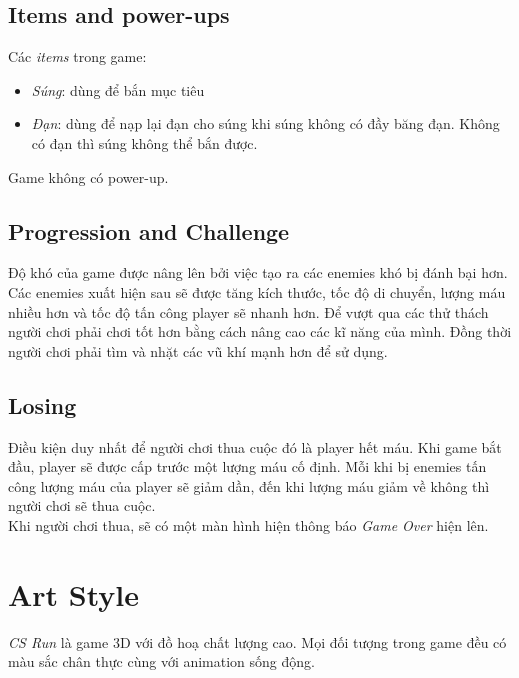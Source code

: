 \documentclass[14pt,a4paper]{extreport}
\begin{document}

\section{Items and power-ups}
Các \textit{items} trong game: 
\begin{itemize}
	\item \textit{Súng}: dùng để bắn mục tiêu
	\item \textit{Đạn}: dùng để nạp lại đạn cho súng khi súng không có đầy băng đạn. Không có đạn thì súng không thể bắn được.

\end{itemize}

Game không có power-up.

\section{Progression and Challenge}
Độ khó của game được nâng lên bởi việc tạo ra các enemies khó bị đánh bại hơn. Các enemies xuất hiện sau sẽ được tăng kích thước, tốc độ di chuyển, lượng máu nhiều hơn và tốc độ tấn công player sẽ nhanh hơn. Để vượt qua các thử thách người chơi phải chơi tốt hơn bằng cách nâng cao các kĩ năng của mình. Đồng thời người chơi phải tìm và nhặt các vũ khí mạnh hơn để sử dụng.


\section{Losing}
Điều kiện duy nhất để người chơi thua cuộc đó là player hết máu. Khi game bắt đầu, player sẽ được cấp trước một lượng máu cố định. Mỗi khi bị enemies tấn công lượng máu của player sẽ giảm dần, đến khi lượng máu giảm về không thì người chơi sẽ thua cuộc. \\
Khi người chơi thua, sẽ có một màn hình hiện thông báo \textit{Game Over} hiện lên.

\chapter{Art Style}
\textit{CS Run} là game 3D với đồ hoạ chất lượng cao. Mọi đối tượng trong game đều có màu sắc chân thực cùng với animation sống động.\\
\\
\end{document}
